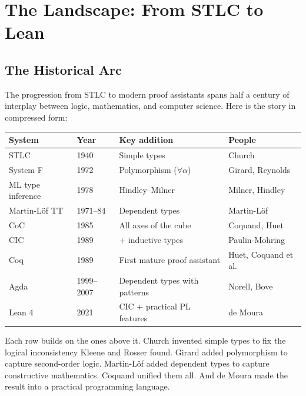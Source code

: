 \documentclass[11pt,a4paper]{article}
\theoremstyle{definition}
\begin{document}

\section{The Landscape: From STLC to Lean}\label{sec:landscape-sec}


\subsection{The Historical Arc}

The progression from STLC to modern proof assistants spans half a century of
interplay between logic, mathematics, and computer science. Here is the story
in compressed form:

\begin{center}
\renewcommand{\arraystretch}{1.5}
\begin{tabular}{llp{5cm}l}
\textbf{System} & \textbf{Year} & \textbf{Key addition} & \textbf{People} \\
\hline
STLC & 1940 & Simple types & Church \\
System F & 1972 & Polymorphism ($\forall\alpha$) & Girard, Reynolds \\
ML type inference & 1978 & Hindley--Milner & Milner, Hindley \\
Martin-L\"of TT & 1971--84 & Dependent types & Martin-L\"of \\
CoC & 1985 & All axes of the cube & Coquand, Huet \\
CIC & 1989 & $+$ inductive types & Paulin-Mohring \\
Coq & 1989 & First mature proof assistant & Huet, Coquand et al. \\
Agda & 1999--2007 & Dependent types with patterns & Norell, Bove \\
Lean 4 & 2021 & CIC $+$ practical PL features & de Moura \\
\end{tabular}
\end{center}

Each row builds on the ones above it. Church invented simple types to fix the
logical inconsistency Kleene and Rosser found. Girard added polymorphism to
capture second-order logic. Martin-L\"of added dependent types to capture
constructive mathematics. Coquand unified them all. And de Moura made the
result into a practical programming language.
\end{document}
